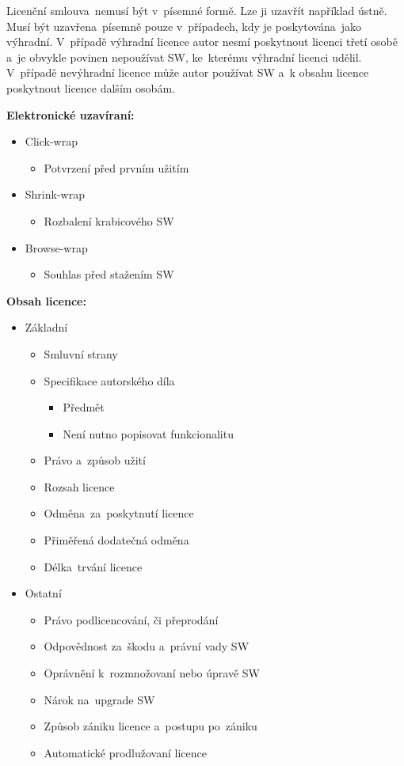 Licenční smlouva~nemusí být v~písemné formě. Lze ji uzavřít například ústně. Musí být uzavřena~písemně pouze v~případech, kdy je poskytována~jako výhradní. V~případě výhradní licence autor nesmí poskytnout licenci třetí osobě a~je obvykle povinen nepoužívat SW, ke~kterému výhradní licenci udělil. V~případě nevýhradní licence může autor používat SW a~k obsahu licence poskytnout licence dalším osobám.
\newline

\noindent\textbf{Elektronické uzavíraní:}
\begin{itemize} 
	\item Click-wrap
	\begin{itemize} 
		\item Potvrzení před prvním užitím
	\end{itemize}
	\item Shrink-wrap
	\begin{itemize} 
		\item Rozbalení krabicového SW
	\end{itemize}
	\item Browse-wrap
	\begin{itemize} 
		\item Souhlas před stažením SW
	\end{itemize}
\end{itemize}

\noindent\textbf{Obsah licence:}
\begin{itemize} 
	\item Základní
	\begin{itemize} 
		\item Smluvní strany
		\item Specifikace autorského díla
		\begin{itemize} 
			\item Předmět
			\item Není nutno popisovat funkcionalitu
		\end{itemize}
		\item Právo a~způsob užití
		\item Rozsah licence
		\item Odměna~za~poskytnutí licence
		\item Přiměřená dodatečná odměna
		\item Délka~trvání licence
	\end{itemize}
	\item Ostatní
	\begin{itemize} 
		\item Právo podlicencování, či přeprodání
		\item Odpovědnost za~škodu a~právní vady SW
		\item Oprávnění k~rozmnožovaní nebo úpravě SW
		\item Nárok na~upgrade SW
		\item Způsob zániku licence a~postupu po~zániku
		\item Automatické prodlužovaní licence
	\end{itemize}
\end{itemize}

